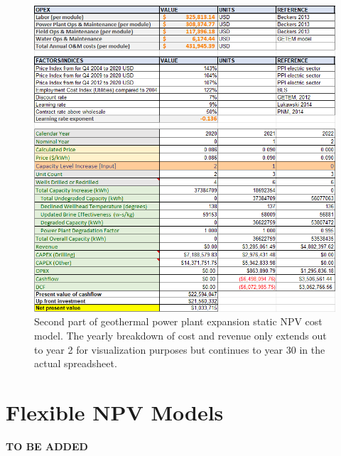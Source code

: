 \begin{figure}[H]
\centering
\includegraphics[width=\textwidth]{templates/images/Figure-Static_Model_SheetB.png}
\caption[Static cost model worksheet (part 2)]{Second part of geothermal power plant expansion static NPV cost model. The yearly breakdown of cost and revenue only extends out to year 2 for visualization purposes but continues to year 30 in the actual spreadsheet.}
\label{fig:static_model_sheet2}
\end{figure}
\pagebreak
\section{Flexible NPV Models}\label{app:B_flex_models}

\textbf{TO BE ADDED}